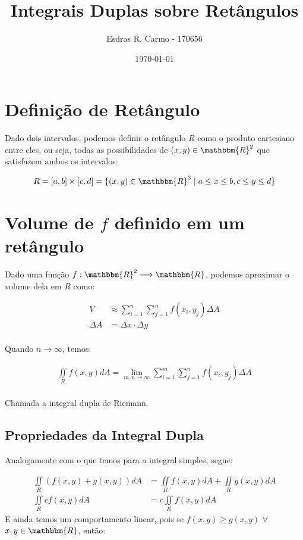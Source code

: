 \documentclass{article}
\author{Esdras R. Carmo - 170656}
\title{Integrais Duplas sobre Retângulos}
\date{\today}
\newcommand{\doubleint}[1] {\iint\limits_R #1 dA}
\begin{document}
    \maketitle
   
    \section{Definição de Retângulo}
        Dado dois intervalos, podemos definir o retângulo $R$ como o produto cartesiano
        entre eles, ou seja, todas as possibilidades de $(x, y) \in \mathbbm{R}^2$
        que satisfazem ambos os intervalos:

        \begin{align*}
            R = [a, b] \times [c, d] = \{(x, y) \in \mathbbm{R}^3 \mid a \leq x \leq b, c \leq y \leq d\}
        \end{align*}

    \section{Volume de $f$ definido em um retângulo}
        Dado uma função $f: \mathbbm{R}^2 \longrightarrow \mathbbm{R}$, podemos aproximar
        o volume dela em $R$ como:

        \begin{align*}
            V &\approx \sum_{i=1}^n \sum_{j=1}^n f(x_i, y_j) \Delta A\\
            \Delta A &= \Delta x \cdot \Delta y\\
        \end{align*}

        Quando $n \to \infty$, temos:

        \begin{align*}
            \doubleint{f(x,y)} = \lim_{m,n \to \infty} \sum_{i=1}^m \sum_{j=1}^n f(x_i, y_j) \Delta A\\
        \end{align*}

        Chamada a integral dupla de Riemann.

        \subsection{Propriedades da Integral Dupla}
            Analogamente com o que temos para a integral simples, segue:

            \begin{align*}
                \doubleint{(f(x,y) + g(x, y))} &= \doubleint{f(x, y)} + \doubleint{g(x, y)}\\
                \doubleint{c f(x, y)} &= c \doubleint{f(x, y)}
            \end{align*}
            E ainda temos um comportamento linear, pois se $f(x, y) \geq g(x, y)$ $\forall$ $x, y \in \mathbbm{R}$, então:
\end{document}
